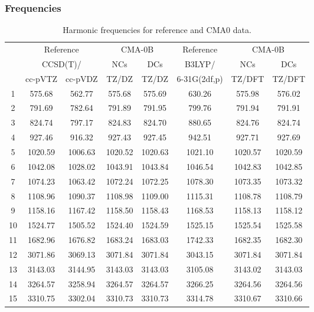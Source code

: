 \documentclass[10pt,oneside]{article}
\begin{document}
\clearpage

\subsubsection*{Frequencies}
\begin{table}[h!]
\centering
\caption{Harmonic frequencies for reference and CMA0 data.}
\begin{tabular}{cccccccc}
\toprule
{} & \multicolumn{2}{c}{Reference} & \multicolumn{2}{c}{CMA-0B} &    Reference & \multicolumn{2}{c}{CMA-0B} \\
{} & \multicolumn{2}{c}{CCSD(T)/} &     NCs &     DCs &       B3LYP/ &     NCs &     DCs \\
{} &   cc-pVTZ & cc-pVDZ &   TZ/DZ &   TZ/DZ & 6-31G(2df,p) &  TZ/DFT &  TZ/DFT \\
\midrule
1  &    575.68 &  562.77 &  575.68 &  575.69 &       630.26 &  575.98 &  576.02 \\
2  &    791.69 &  782.64 &  791.89 &  791.95 &       799.76 &  791.94 &  791.91 \\
3  &    824.74 &  797.17 &  824.83 &  824.70 &       880.65 &  824.76 &  824.74 \\
4  &    927.46 &  916.32 &  927.43 &  927.45 &       942.51 &  927.71 &  927.69 \\
5  &   1020.59 & 1006.63 & 1020.52 & 1020.63 &      1021.10 & 1020.57 & 1020.59 \\
6  &   1042.08 & 1028.02 & 1043.91 & 1043.84 &      1046.54 & 1042.83 & 1042.85 \\
7  &   1074.23 & 1063.42 & 1072.24 & 1072.25 &      1078.30 & 1073.35 & 1073.32 \\
8  &   1108.96 & 1090.37 & 1108.98 & 1109.00 &      1115.31 & 1108.78 & 1108.79 \\
9  &   1158.16 & 1167.42 & 1158.50 & 1158.43 &      1168.53 & 1158.13 & 1158.12 \\
10 &   1524.77 & 1505.52 & 1524.40 & 1524.59 &      1525.15 & 1525.54 & 1525.58 \\
11 &   1682.96 & 1676.82 & 1683.24 & 1683.03 &      1742.33 & 1682.35 & 1682.30 \\
12 &   3071.86 & 3069.13 & 3071.84 & 3071.84 &      3043.15 & 3071.84 & 3071.84 \\
13 &   3143.03 & 3144.95 & 3143.03 & 3143.03 &      3105.08 & 3143.02 & 3143.03 \\
14 &   3264.57 & 3258.94 & 3264.57 & 3264.57 &      3266.25 & 3264.56 & 3264.56 \\
15 &   3310.75 & 3302.04 & 3310.73 & 3310.73 &      3314.78 & 3310.67 & 3310.66 \\
\bottomrule
\end{tabular}
\end{table}
\end{document}
